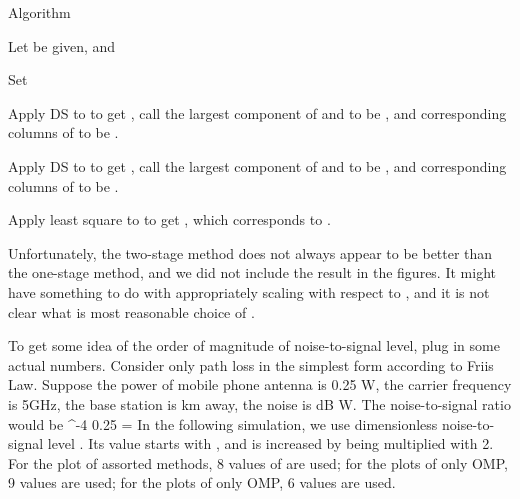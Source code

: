 \Result
{Algorithm}
{
\startitemize[n]
\item Let  be given, and 

\item Set

\item Apply DS to  to get , call the  largest component of  and to be , and corresponding columns of  to be .

\item Apply DS to  to get , call the  largest component of  and to be , and corresponding columns of  to be .

\item Apply least square to  to get , which corresponds to .
\stopitemize
}

Unfortunately, the two-stage method does not always appear to be better than the one-stage method, and we did not include the result in the figures.
It might have something to do with appropriately scaling  with respect to ,
and it is not clear what is most reasonable choice of .

\stopsubsection

\startsection [title={Result}]

\startsubsection [title={Settings}]

To get some idea of the order of magnitude of noise-to-signal level, plug in some actual numbers.
Consider only path loss in the simplest form according to Friis Law.
Suppose the power of mobile phone antenna is 0.25 W,
the carrier frequency is 5GHz,
the base station is  km away,
the noise is  dB W.
The noise-to-signal ratio would be
 {
^{-4}  {0.25} 
= \NR
}
In the following simulation, we use dimensionless noise-to-signal level \m {\s}.
Its value starts with , and is increased by being multiplied with 2.
For the plot of assorted methods, 8 values of \m {\s} are used; for the plots of only OMP, 9 values are used; for the plots of only OMP, 6 values are used.

